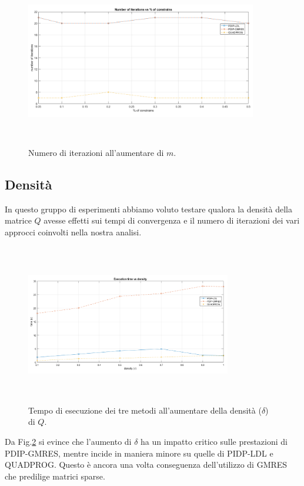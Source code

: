 \begin{figure}[!h]
    \centering
    \includegraphics[width=0.9\textwidth, height=7.5cm]{img/MU8.png}
    \caption{Numero di iterazioni all'aumentare di $m$. \label{fig:exp2.2}}
\end{figure}


\subsection{Densità}

 In questo gruppo di esperimenti abbiamo voluto testare qualora la densità della matrice $Q$ avesse effetti sui tempi di convergenza e il numero di iterazioni dei vari approcci coinvolti nella nostra analisi.

\begin{figure}[!h]
    \centering
    \includegraphics[width=0.8\textwidth, height=7cm]{img/MU4.png}
    \caption{Tempo di esecuzione dei tre metodi all'aumentare della densità ($\delta$) di $Q$. \label{fig:exp3.1}}
\end{figure}
 
Da Fig.\ref{fig:exp3.1} si evince che l'aumento di $\delta$ ha un impatto critico sulle prestazioni di PDIP-GMRES, mentre incide in maniera minore su quelle di PIDP-LDL e QUADPROG. Questo è ancora una volta conseguenza dell'utilizzo di GMRES che predilige matrici sparse. 

